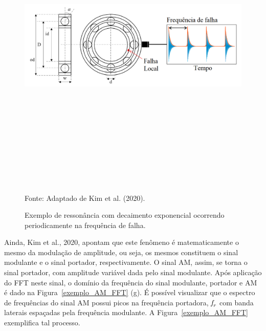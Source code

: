 \documentclass[
	12pt,				
	oneside,			
	a4paper,			
	english,			
	brazil,			
	]{abntex2ppgsi}
\newcommand{\f}{\mkern-2mu f\mkern-3mu}
\begin{document}
\begin{figure}[!htb]
\centering
\caption {Exemplo de ressonância com decaimento exponencial ocorrendo periodicamente na frequência de falha.}
\includegraphics[width=\textwidth,height=150mm,keepaspectratio]{exemplo_ressonancia_falha} \\
Fonte: Adaptado de Kim et al. (2020).
\label{exemplo_ressonancia_falha}
\end{figure}

Ainda, Kim et al., 2020, apontam que este fenômeno é matematicamente o mesmo da modulação de amplitude, ou seja, os mesmos constituem o sinal modulante e o sinal portador, respectivamente. O sinal AM, assim, se torna o sinal portador, com amplitude variável dada pelo sinal modulante. Após aplicação do FFT neste sinal, o domínio da frequência do sinal modulante, portador e AM é dado na Figura~\ref{exemplo_AM_FFT} (g). É possível visualizar que o espectro de frequências do sinal AM possui picos na frequência portadora, ${\f}_r$ com banda laterais espaçadas pela frequência modulante. A Figura~\ref{exemplo_AM_FFT} exemplifica tal processo. 
\end{document}
